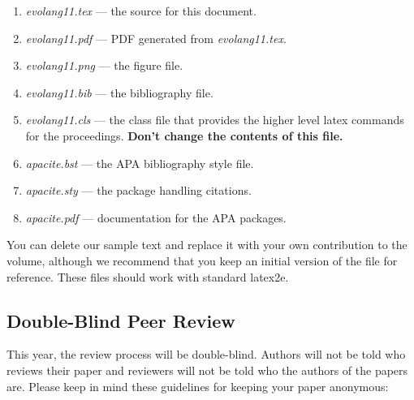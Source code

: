 \documentclass{evolang11}
\begin{document}
\begin{enumerate}

\item {\em evolang11.tex} --- the source for this document.

\item {\em evolang11.pdf} --- PDF generated from {\em evolang11.tex}.

\item {\em evolang11.png} --- the figure file.

\item {\em evolang11.bib} --- the bibliography file.

\item {\em evolang11.cls} --- the class file that provides the higher
level latex commands for the proceedings. \textbf{Don't change the contents of this file.}

\item {\em apacite.bst} --- the APA bibliography style file.

\item {\em apacite.sty} --- the package handling citations.

\item {\em apacite.pdf} --- documentation for the APA packages.

\end{enumerate}

You can delete our sample text and replace it with your own
contribution to the volume, although we recommend that you keep an
initial version of the file for reference.  These files should work with
standard latex2e.

\subsection{Double-Blind Peer Review}

This year, the review process will be double-blind.  Authors will not be told who reviews their paper and reviewers will not be told who the authors of the papers are.  Please keep in mind these guidelines for keeping your paper anonymous:
\end{document}
